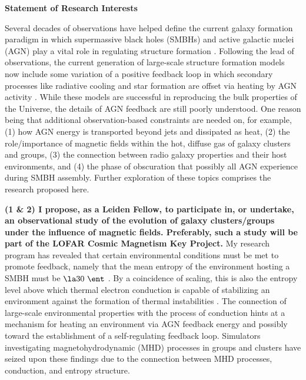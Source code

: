 \documentclass[11pt]{article}
\begin{document}
\begin{center}
\textbf{Statement of Research Interests}
\end{center}

Several decades of observations have helped define the current galaxy
formation paradigm in which supermassive black holes (SMBHs) and
active galactic nuclei (AGN) play a vital role in regulating structure
formation \cite[\eg][]{1995ARA&A..33..581K, magorrian,
2000ApJ...539L...9F, 2000ApJ...539L..13G, marconihunt03,
2005MNRAS.362...25B, perseus1, mcnamrev, birzan08}. Following the lead
of observations, the current generation of large-scale structure
formation models now include some variation of a positive feedback
loop in which secondary processes like radiative cooling and star
formation are offset via heating by AGN activity
\cite[\eg][]{croton06, bower06, saro06, sijacki07}. While these models
are successful in reproducing the bulk properties of the Universe, the
details of AGN feedback are still poorly understood. One reason being
that additional observation-based constraints are needed on, for
example, (1) how AGN energy is transported beyond jets and dissipated
as heat, (2) the role/importance of magnetic fields within the hot,
diffuse gas of galaxy clusters and groups, (3) the connection between
radio galaxy properties and their host environments, and (4) the phase
of obscuration that possibly all AGN experience during SMBH
assembly. Further exploration of these topics comprises the research
proposed here.

{\bf{(1 \& 2) I propose, as a Leiden Fellow, to participate in, or
undertake, an observational study of the evolution of galaxy
clusters/groups under the influence of magnetic fields. Preferably,
such a study will be part of the LOFAR Cosmic Magnetism Key Project.}}
My research program has revealed that certain environmental conditions
must be met to promote feedback, namely that the mean entropy of the
environment hosting a SMBH must be $\la 30 ~\ent$
\cite[][see also Fig. \ref{fig:figs}]{d06, haradent, accept}. By a
coincidence of scaling, this is also the entropy level above which
thermal electron conduction is capable of stabilizing an environment
against the formation of thermal instabilities
\cite{conduction}. The connection of large-scale environmental
properties with the process of conduction hints at a mechanism for
heating an environment via AGN feedback energy and possibly toward the
establishment of a self-regulating feedback loop. Simulators
investigating magnetohydrodynamic (MHD) processes in groups and
clusters have seized upon these findings due to the connection between
MHD processes, conduction, and entropy structure.
\end{document}
